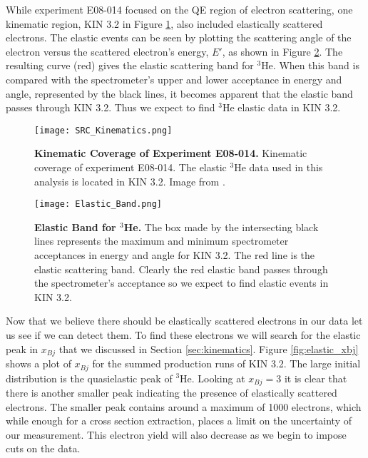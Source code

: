 While experiment E08-014 focused on the QE region of electron scattering, one kinematic region, KIN 3.2 in Figure \ref{fig:kin3.2}, also included elastically scattered electrons. The elastic events can be seen by plotting the scattering angle of the electron versus the scattered electron's energy, $E'$, as shown in Figure \ref{fig:elastic_band}. The resulting curve (red) gives the elastic scattering band for $^3$He. When this band is compared with the spectrometer's upper and lower acceptance in energy and angle, represented by the black lines, it becomes apparent that the elastic band passes through KIN 3.2. Thus we expect to find $^3$He elastic data in KIN 3.2. 

\begin{figure}[!ht]
\begin{center}
\texttt{[image: SRC\_Kinematics.png]}
\end{center}
\caption[Kinematic Coverage of Experiment E08-014]{
{\bf{Kinematic Coverage of Experiment E08-014.}} Kinematic coverage of experiment E08-014. The elastic $^3$He data used in this analysis is located in KIN 3.2. Image from \cite{Thesis:Ye}.}
\label{fig:kin3.2}
\end{figure}

\begin{figure}[!ht]
\begin{center}
\texttt{[image: Elastic\_Band.png]}
\end{center}
\caption[Elastic Band for $^3$He]{
{\bf{Elastic Band for $^3$He.}} The box made by the intersecting black lines represents the maximum and minimum spectrometer acceptances in energy and angle for KIN 3.2. The red line is the elastic scattering band. Clearly the red elastic band passes through the spectrometer's acceptance so we expect to find elastic events in KIN 3.2.}
\label{fig:elastic_band}
\end{figure}

Now that we believe there should be elastically scattered electrons in our data let us see if we can detect them. To find these electrons we will search for the elastic peak in $x_{Bj}$ that we discussed in Section \ref{sec:kinematics}. Figure \ref{fig:elastic_xbj} shows a plot of $x_{Bj}$ for the summed production runs of KIN 3.2. The large initial distribution is the quasielastic peak of $^3$He. Looking at $x_{Bj}=3$ it is clear that there is another smaller peak indicating the presence of elastically scattered electrons. The smaller peak contains around a maximum of 1000 electrons, which while enough for a cross section extraction, places a limit on the uncertainty of our measurement. This electron yield will also decrease as we begin to impose cuts on the data.

